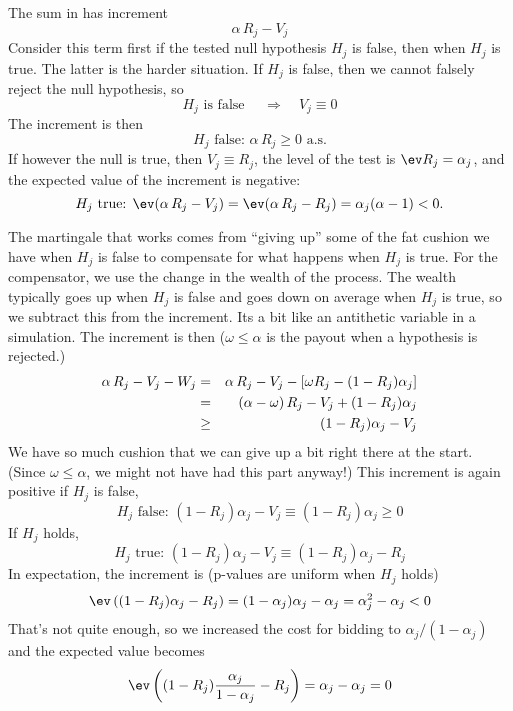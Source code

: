 \documentclass[12pt]{article}
\begin{document}
 The sum in  has increment
 \begin{equation}
   \alpha\,R_j - V_j    
 \label{eq:increment}
 \end{equation}
 Consider this term first if the tested null hypothesis $H_j$ is false, then
 when $H_j$ is true.  The latter is the harder situation.  If $H_j$ is false,
 then we cannot falsely reject the null hypothesis, so
 \begin{displaymath}
     H_j \mbox{ is false } \quad \Rightarrow \quad V_j \equiv 0
 \end{displaymath}
 The increment is then
 \begin{displaymath}
     H_j \mbox{ false: }  \alpha\,R_j \ge 0 \mbox{ a.s.}
 \end{displaymath}
 If however the null is true, then $V_j \equiv R_j$, the level of the test is
 $\ev R_j = \alpha_j$, and the expected value of the increment is negative:
 \begin{displaymath}
     H_j \mbox{ true: }  
      \ev(\alpha\,R_j - V_j) = \ev(\alpha\,R_j - R_j) = \alpha_j(\alpha-1) < 0.
 \end{displaymath}


 The martingale that works comes from ``giving up'' some of the fat cushion we
 have when $H_j$ is false to compensate for what happens when $H_j$ is true.
  For the compensator, we use the change in the wealth of the process.  The
 wealth typically goes up when $H_j$ is false and goes down on average when
 $H_j$ is true, so we subtract this from the increment.  Its a bit like an
 antithetic variable in a simulation.  The increment is then ($\omega \le
 \alpha$ is the payout when a hypothesis is rejected.)
 \begin{eqnarray*}
   \alpha\,R_j - V_j - W_j 
    &=&  \alpha\,R_j - V_j - [\omega R_j - (1-R_j)\alpha_j] \cr
    &=& (\alpha-\omega)\,R_j - V_j + (1-R_j)\alpha_j  \cr
    &\ge& (1-R_j)\alpha_j - V_j 
 \label{eq:increment2}
 \end{eqnarray*}
 We have so much cushion that we can give up a bit right there at the
 start. (Since $\omega \le \alpha$, we might not have had this part anyway!)
 This increment is again positive if $H_j$ is false,
 \begin{displaymath}
    H_j \mbox{ false: }  (1-R_j)\alpha_j - V_j \equiv (1-R_j)\alpha_j \ge 0
 \end{displaymath}
 If $H_j$ holds,
 \begin{displaymath}
    H_j \mbox{ true: }  (1-R_j)\alpha_j - V_j \equiv (1-R_j)\alpha_j - R_j
 \end{displaymath}
 In expectation, the increment is (p-values are uniform when $H_j$ holds)
 \begin{displaymath}
  \ev \left( (1-R_j)\alpha_j - R_j \right) 
    = (1-\alpha_j)\alpha_j - \alpha_j 
    = \alpha_j^2 - \alpha_j < 0
 \end{displaymath}
 That's not quite enough, so we increased the cost for bidding to
 $\alpha_j/(1-\alpha_j)$ and the expected value becomes
 \begin{displaymath}
   \ev \left( (1-R_j)\frac{\alpha_j}{1-\alpha_j} - R_j \right)
    = \alpha_j - \alpha_j = 0 
 \end{displaymath}
\end{document}
